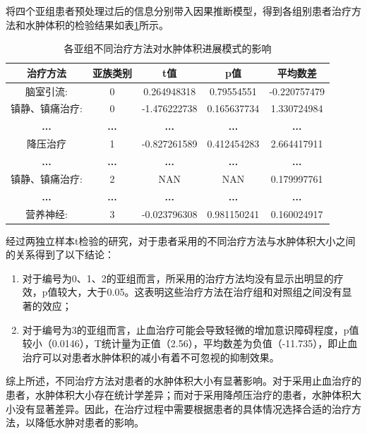 \documentclass[bwprint]{gmcmthesis}
\begin{document}
将四个亚组患者预处理过后的信息分别带入因果推断模型，得到各组别患者治疗方法和水肿体积的检验结果如表\ref{tab:各亚组治疗方法水肿}所示。
\begin{table}[ht]
\centering
\caption{各亚组不同治疗方法对水肿体积进展模式的影响}
\label{tab:各亚组治疗方法水肿}
\fontsize{11}{9}\selectfont
\renewcommand\tabcolsep{6pt}
{
\begin{tabular}{ccccc}
\toprule[1.2pt]
治疗方法         & 亚族类别         & t值           & p值           & 平均数差         \\ \midrule
脑室引流:        & 0            & 0.264948318  & 0.79554551   & -0.220757479 \\
镇静、镇痛治疗:     & 0            & -1.476222738 & 0.165637734  & 1.330724984  \\
\textbf{...} & \textbf{...} & \textbf{...} & \textbf{...} & \textbf{...} \\
降压治疗         & 1            & -0.827261589 & 0.412454283  & 2.664417911  \\
\textbf{...} & \textbf{...} & \textbf{...} & \textbf{...} & \textbf{...} \\
镇静、镇痛治疗:     & 2            & NAN          & NAN          & 0.179997761  \\
\textbf{...} & \textbf{...} & \textbf{...} & \textbf{...} & \textbf{...} \\
营养神经:        & 3            & -0.023796308 & 0.981150241  & 0.160024917  \\ \bottomrule[1.2pt]
\end{tabular}}
\end{table}

经过两独立样本t检验的研究，对于患者采用的不同治疗方法与水肿体积大小之间的关系得到了以下结论：



\begin{enumerate}
    \item 对于编号为0、1、2的亚组而言，所采用的治疗方法均没有显示出明显的疗效，p值较大，大于0.05。这表明这些治疗方法在治疗组和对照组之间没有显著的效应；
    \item 对于编号为3的亚组而言，止血治疗可能会导致轻微的增加意识障碍程度，p值较小（0.0146），T统计量为正值（2.56），平均数差为负值（-11.735），即止血治疗可以对患者水肿体积的减小有着不可忽视的抑制效果。
\end{enumerate}

综上所述，不同治疗方法对患者的水肿体积大小有显著影响。对于采用止血治疗的患者，水肿体积大小存在统计学差异；而对于采用降颅压治疗的患者，水肿体积大小没有显著差异。因此，在治疗过程中需要根据患者的具体情况选择合适的治疗方法，以降低水肿对患者的影响。
\end{document}
